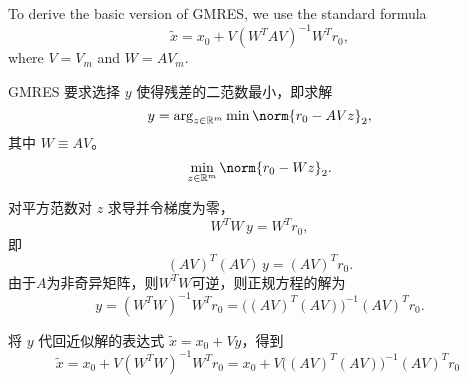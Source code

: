 \documentclass{ctexart}
\begin{document}
\begin{problem}
  To derive the basic version of GMRES, we use the standard formula
  \begin{equation} \label{eq:5.7}
    \tilde{x} = x_0 + V \left( W^{T} A V \right)^{-1} W^{T} r_0,
  \end{equation}
  where \( V = V_m \) and \( W = A V_m \).
\end{problem}
\begin{solution}
  GMRES 要求选择 \(y\) 使得残差的二范数最小，即求解
  \[
    y = \arg_{z\in\mathbb{R}^m}\min \norm{r_0 - A V z}_2,
  \]
  其中 \(W \equiv A V\)。
  \[
    \min_{z\in\mathbb{R}^m} \norm{r_0 - W z}_2.
  \]

  对平方范数对 \(z\) 求导并令梯度为零，
  \[
    W^T W \, y = W^T r_0,
  \]
  即
  \[
    ( A V )^T ( A V ) \, y = ( A V )^T r_0.
  \]
  由于\(A \)为非奇异矩阵，则\(W^T W\)可逆，则正规方程的解为
  \[
    y = (W^T W)^{-1} W^T r_0 = \big( (AV)^T (AV) \big)^{-1} (AV)^T r_0.
  \]

  将 \(y\) 代回近似解的表达式 \( \tilde{x} = x_0 + V y \)，得到
  \[
    \tilde{x} = x_0 + V (W^T W)^{-1} W^T r_0
    = x_0 + V \big( (AV)^T(AV) \big)^{-1} (AV)^T r_0 \;
  \]
\end{solution}
\end{document}
